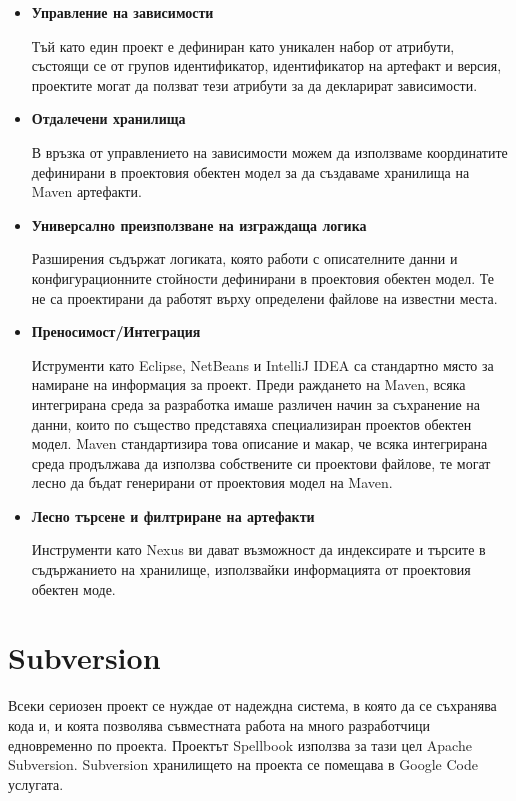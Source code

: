 \begin{itemize}
  \item \textbf{Управление на зависимости}

    Тъй като един проект е дефиниран като уникален набор от
    атрибути, състоящи се от групов идентификатор, идентификатор на
    артефакт и версия, проектите могат да ползват тези атрибути за да
    декларират зависимости.

  \item \textbf{Отдалечени хранилища}
    
    В връзка от управлението на зависимости можем да използваме
    координатите дефинирани в проектовия обектен модел за да създаваме
    хранилища на Maven артефакти.
  
  \item \textbf{Универсално преизползване на изграждаща логика}
    
    Разширения съдържат логиката, която работи с описателните данни и
    конфигурационните стойности дефинирани в проектовия обектен
    модел. Те не са проектирани да работят върху определени файлове на
    известни места.

  \item \textbf{Преносимост/Интеграция}
    
    Иструменти като Eclipse, NetBeans и IntelliJ IDEA са стандартно
    място за намиране на информация за проект. Преди раждането на
    Maven, всяка интегрирана среда за разработка имаше различен начин
    за съхранение на данни, които по същество представяха
    специализиран проектов обектен модел. Maven стандартизира това
    описание и макар, че всяка интегрирана среда продължава да
    използва собствените си проектови файлове, те могат лесно да бъдат
    генерирани от проектовия модел на Maven.

  \item \textbf{Лесно търсене и филтриране на артефакти}
    
    Инструменти като Nexus ви дават възможност да индексирате и
    търсите в съдържанието на хранилище, използвайки информацията от
    проектовия обектен моде.
\end{itemize}
\section{Subversion}

Всеки сериозен проект се нуждае от надеждна система, в която да се
съхранява кода и, и коята позволява съвместната работа на много
разработчици едновременно по проекта. Проектът Spellbook използва за
тази цел Apache Subversion. Subversion хранилището на проекта се
помещава в Google Code услугата.
